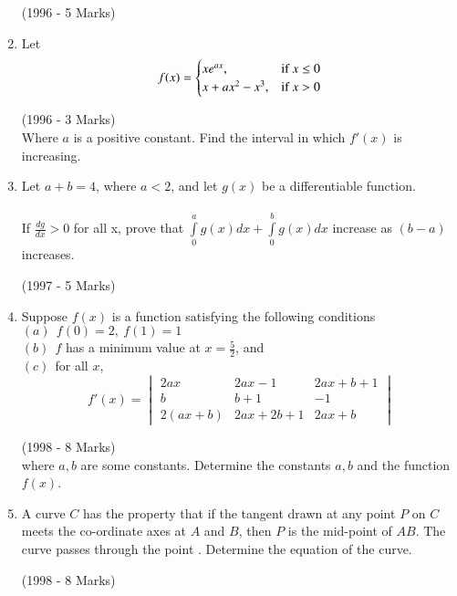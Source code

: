 \documentclass[journal,12pt,twocolumn]{IEEEtran}
\theoremstyle{remark}
\begin{document}
\begin{enumerate}
\hfill {(1996 - 5 Marks)}\\


\item Let 
\[ f(x) = \begin{cases}
xe^{ax}, & \text{if } x \leq 0\\
x+ax^2 - x^3, & \text{if } x > 0
\end{cases}\\
\]

\hfill {(1996 - 3 Marks)}\\

Where $a$ is a positive constant. Find the interval in which $f'(x)$ is increasing.\\

\item Let $a + b = 4$, where $a<2$, and let $g(x)$ be a differentiable function.\\\\
If $\frac{dg}{dx}>0$ for all x, prove that $\int\limits_0^a g(x) dx + \int\limits_0^b g(x) dx$ increase as $(b-a)$ increases.

\hfill {(1997 - 5 Marks)}\\


\item Suppose $f(x)$ is a function satisfying the following conditions\\
$(a) \ \ f(0) = 2,\ f(1) = 1$\\
$(b) \ \ f$ has a minimum value at $x = \frac{5}{2}$, and\\
$(c) \ \ $for all $x$,\\
$$f'(x)=
\begin{vmatrix}
2ax & 2ax-1 & 2ax+b+1\\
b & b+1 & -1\\
2(ax+b) & 2ax+2b+1 & 2ax+b
\end{vmatrix}$$

\hfill {(1998 - 8 Marks)}\\

where $a, b$ are some constants. Determine the constants $a, b$ and the function $f(x)$.

\item A curve $C$ has the property that if the tangent drawn at any point $P$ on $C$ meets the co-ordinate axes at $A$ and $B$, then $P$ is the mid-point of $AB$. The curve passes through the point . Determine the equation of the curve.

\hfill {(1998 - 8 Marks)}\\

 
\end{enumerate}
\end{document}
